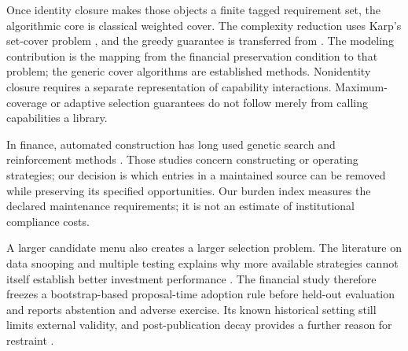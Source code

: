 Once identity closure makes those objects a finite tagged requirement set,
the algorithmic core is classical weighted cover. The complexity reduction
uses Karp's set-cover problem \citep{Karp1972}, and the greedy guarantee is
transferred from \citet{Chvatal1979}. The modeling contribution is the mapping
from the financial preservation condition to that problem; the generic cover
algorithms are established methods. Nonidentity closure requires a separate
representation of capability interactions. Maximum-coverage or adaptive
selection guarantees do not follow merely from calling capabilities a library.

In finance, automated construction has long used genetic search and
reinforcement methods \citep{AllenKarjalainen1999,MoodySaffell2001}.
Those studies concern constructing or operating strategies; our decision is
which entries in a maintained source can be removed while preserving its
specified opportunities. Our burden index measures the declared maintenance
requirements; it is not an estimate of institutional compliance costs.

A larger candidate menu also creates a larger selection problem. The
literature on data snooping and multiple testing explains why more available
strategies cannot itself establish better investment performance
\citep{SullivanTimmermannWhite1999,White2000,HarveyLiuZhu2016}. The financial
study therefore freezes a bootstrap-based proposal-time adoption rule before
held-out evaluation and reports abstention and adverse exercise. Its known
historical setting still limits external validity, and post-publication decay
provides a further reason for restraint \citep{McLeanPontiff2016}.
